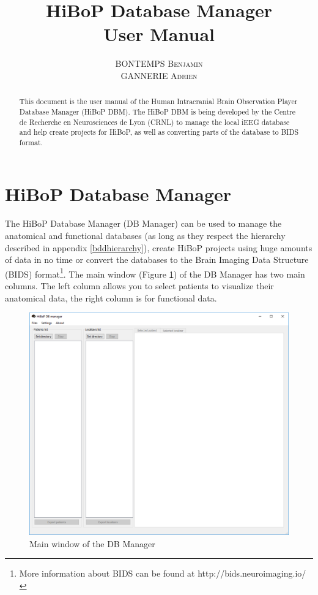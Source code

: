 \documentclass[a4paper]{article}
\title{HiBoP Database Manager \\ User Manual}
\author{\textsc{BONTEMPS Benjamin} \\ \textsc{GANNERIE Adrien}}
\begin{document}
\maketitle
\begin{abstract}
This document is the user manual of the Human Intracranial Brain Observation Player Database Manager (HiBoP DBM). The HiBoP DBM is being developed by the Centre de Recherche en Neurosciences de Lyon (CRNL) to manage the local iEEG database and help create projects for HiBoP, as well as converting parts of the database to BIDS format.
\end{abstract}
\tableofcontents
\section{HiBoP Database Manager}\label{bddmanager}
\paragraph{} The HiBoP Database Manager (DB Manager) can be used to manage the anatomical and functional databases (as long as they respect the hierarchy described in appendix \ref{bddhierarchy}), create HiBoP projects using huge amounts of data in no time or convert the databases to the Brain Imaging Data Structure (BIDS) format\footnote{More information about BIDS can be found at http://bids.neuroimaging.io/}. The main window (Figure \ref{dbManagerMain}) of the DB Manager has two main columns. The left column allows you to select patients to visualize their anatomical data, the right column is for functional data.
\begin{figure}[H]
\begin{center}
\includegraphics[scale=0.3]{DBManagerMain.png}
\end{center}
\caption{\label{dbManagerMain}Main window of the DB Manager}
\end{figure}
\end{document}
